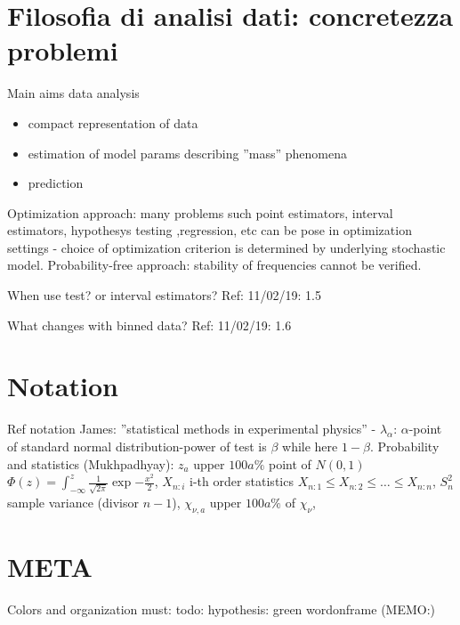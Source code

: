 \section{Filosofia di analisi dati: concretezza problemi}

\begin{frame}{Main aims data analysis}
\begin{itemize}
\item compact representation of data
\item estimation of model params describing ''mass'' phenomena
\item prediction
\end{itemize}
Optimization approach: many problems such point estimators, interval estimators, hypothesys testing ,regression, etc can be pose in optimization settings - choice of optimization criterion is determined by underlying stochastic model.
Probability-free approach: stability of frequencies cannot be verified.
\end{frame}

\begin{frame}{When use test? or interval estimators?}\frameintoc
Ref: 11/02/19: 1.5
\end{frame}

\begin{frame}{What changes with binned data?}
Ref: 11/02/19: 1.6
\end{frame}

\section{Notation}

\begin{frame}{Ref notation}
 James: ''statistical methods in experimental physics'' - $\lambda_{\alpha}$: $\alpha$-point of standard normal distribution-power of test is $\beta$ while here $1-\beta$.
Probability and statistics (Mukhpadhyay): $z_a$ upper $100a\%$ point of $N(0,1)$ $\Phi(z)=\int_{-\infty}^z\frac{1}{\sqrt{2\pi}}\exp{-\frac{x^2}{2}}$, $X_{n:i}$ i-th order statistics $X_{n:1}\leq X_{n:2}\leq\ldots\leq X_{n:n}$, $S_n^2$ sample variance (divisor $n-1$), $\chi_{\nu,a}$ upper $100a\%$ of $\chi_{\nu}$, 
\end{frame}

\section{META}

\begin{frame}{Colors and organization}
must:
todo:
hypothesis: green
wordonframe (MEMO:)
\end{frame}